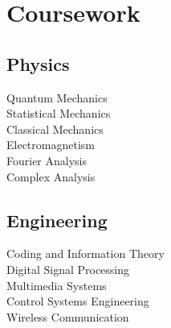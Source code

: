 \documentclass[]{deedy-resume-openfont}
\begin{document}
\begin{minipage}[t]{0.33\textwidth}

\section{Coursework}
\subsection{Physics}
Quantum Mechanics \\
Statistical Mechanics \\
Classical Mechanics \\
Electromagnetism \\
Fourier Analysis \\
Complex Analysis \\
\sectionsep

\subsection{Engineering}
Coding and Information Theory \\
Digital Signal Processing \\
Multimedia Systems \\
Control Systems Engineering \\
Wireless Communication \\
\sectionsep


%
%

\end{minipage} 
\hfill
\end{document}
